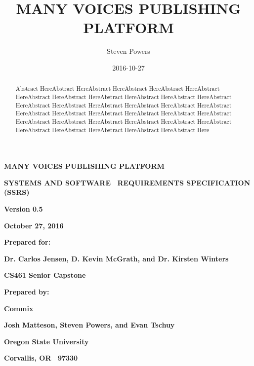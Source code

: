 \documentclass[letterpaper, 10pt, draftclsnofoot, compsoc, onecolumn]{IEEEtran}
\title{MANY VOICES PUBLISHING PLATFORM}
\author{Steven Powers}
\date{2016-10-27}
\begin{document}
\clearpage\setcounter{page}{1}%
\thispagestyle{FirstPage}


\bigskip
\bigskip
\clearpage
{\centering\bfseries\color{black}\huge
MANY VOICES PUBLISHING PLATFORM
\par}
\bigskip
\bigskip
{\centering\bfseries\color{black}\Large
SYSTEMS AND SOFTWARE \ REQUIREMENTS SPECIFICATION (SSRS)
\par}
\bigskip
\bigskip
\bigskip
\bigskip
\bigskip
{\centering\bfseries\color{black}Version 0.5\par}
{\centering\bfseries\color{black}October 27, 2016\par}
\bigskip
\bigskip
{\centering\bfseries\color{black}Prepared for:\par}
{\centering\bfseries\color{black}Dr. Carlos Jensen, D. Kevin McGrath, and Dr. Kirsten Winters\par}
{\centering\bfseries\color{black}CS461 Senior Capstone\par}
\bigskip
\bigskip
{\centering\bfseries\color{black}Prepared by:\par}
{\centering\bfseries\color{black}Commix\par}
{\centering\bfseries\color{black}Josh Matteson, Steven Powers, and Evan Tschuy\par}
{\centering\bfseries\color{black}Oregon State University\par}
{\centering\bfseries\color{black}Corvallis, OR \ 97330\par}
\bigskip

\begin{abstract}
\noindent Abstract HereAbstract HereAbstract HereAbstract HereAbstract HereAbstract HereAbstract HereAbstract HereAbstract HereAbstract HereAbstract HereAbstract HereAbstract HereAbstract HereAbstract HereAbstract HereAbstract HereAbstract HereAbstract HereAbstract HereAbstract HereAbstract HereAbstract HereAbstract HereAbstract HereAbstract HereAbstract HereAbstract HereAbstract HereAbstract HereAbstract HereAbstract HereAbstract HereAbstract HereAbstract Here
\end{abstract}
\end{document}

